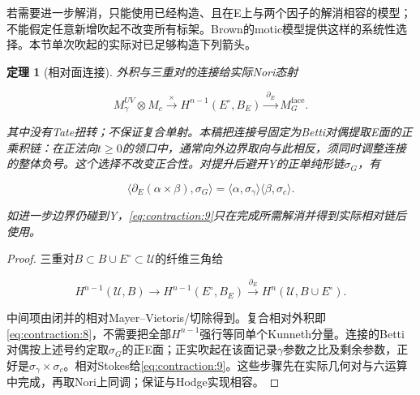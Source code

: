 \documentclass[11pt,a4paper,oneside]{ctexrep}
\theoremstyle{cnplain}
\newtheorem{theorem}{定理}[chapter]
\theoremstyle{definition}
\theoremstyle{remark}
\begin{document}
若需要进一步解消，只能使用已经构造、且在E上与两个因子的解消相容的模型；不能假定任意新增吹起不改变所有标架。Brown的motic模型提供这样的系统性选择\cite{browncosmic}。本节单次吹起的实际对已足够构造下列箭头。

\begin{theorem}[相对面连接]

\label{thm:contraction:3.1} 外积与三重对的连接给实际Nori态射

\begin{equation}
M_\gamma^{UV}\otimes M_c
 \xrightarrow{\ \times\ }H^{n-1}(E^\circ,B_E)
 \xrightarrow{\ \partial_E\ }M_G^{\mathrm{face}}.                \label{eq:contraction:8}
\end{equation}

其中没有Tate扭转；不保证复合单射。本稿把连接号固定为Betti对偶提取E面的正乘积链：在正法向\(t\ge 0\)的领口中，通常向外边界取向与此相反，须同时调整连接的整体负号。这个选择不改变正合性。对提升后避开Y的正单纯形链\(\sigma _G\)，有

\begin{equation}
\langle\partial_E(\alpha\times\beta),\sigma_G\rangle
    =\langle\alpha,\sigma_\gamma\rangle
       \langle\beta,\sigma_c\rangle.                             \label{eq:contraction:9}
\end{equation}

如进一步边界仍碰到Y，\eqref{eq:contraction:9}只在完成所需解消并得到实际相对链后使用。

\end{theorem}

\begin{proof}

三重对\(B\subset B\cup E^\circ\subset \)\(\mathcal U\)的纤维三角给

\begin{equation}
H^{n-1}(\mathcal U,B)\longrightarrow H^{n-1}(E^\circ,B_E)
 \xrightarrow{\partial_E}H^n(\mathcal U,B\cup E^\circ).            \label{eq:contraction:10}
\end{equation}

中间项由闭并的相对Mayer--Vietoris/切除得到。复合相对外积即\eqref{eq:contraction:8}，不需要把全部\(H^{n- 1}\)强行等同单个Kunneth分量。连接的Betti对偶按上述号约定取\(\sigma _G\)的正E面；正实吹起在该面记录\(\gamma \)参数之比及剩余参数，正好是\(\sigma _\gamma \times \sigma _c\)。相对Stokes给\eqref{eq:contraction:9}。这些步骤先在实际几何对与六运算中完成，再取Nori上同调；\cite{tubach}保证与Hodge实现相容。

\end{proof}
\end{document}
